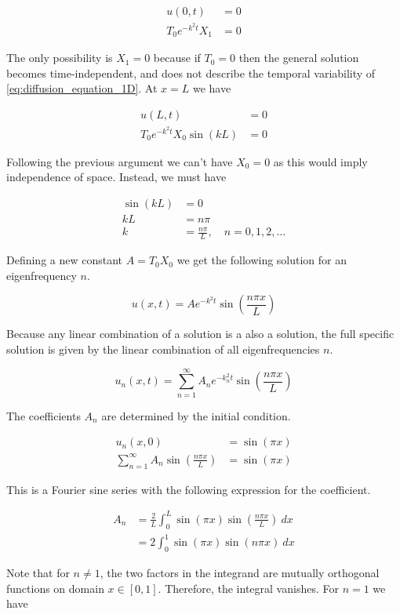 \documentclass[12pt]{extarticle}
\begin{document}
\begin{align*}
	u(0,t) &= 0 \\
	T_0 e^{-k^2 t} X_1 &= 0 
\end{align*}

The only possibility is $X_1 = 0$ because if $T_0=0$ then the general solution becomes time-independent, and does not describe the temporal variability of  \eqref{eq:diffusion_equation_1D}. At $x=L$ we have

\begin{align*}
	u(L,t) &= 0 \\
	T_0 e^{-k^2 t} X_0 \sin(kL) &= 0
\end{align*}

Following the previous argument we can't have $X_0=0$ as this would imply independence of space. Instead, we must have 

\begin{align*}
	\sin(kL) &= 0 \\
	kL &= n\pi \\
	k &= \frac{n\pi}{L}, \quad n=0,1,2,\dots
\end{align*}

Defining a new constant $A=T_0 X_0$ we get the following solution for an eigenfrequency $n$.

\[ u(x,t) = A e^{-k^2t} \sin(\frac{n\pi x}{L}) \]

Because any linear combination of a solution is a also a solution, the full specific solution is given by the linear combination of all eigenfrequencies $n$.

\[ u_n(x,t) = \sum_{n=1}^{\infty} A_n e^{-k_n^2 t} \sin(\frac{n\pi x}{L}) \]

The coefficients $A_n$ are determined by the initial condition.

\begin{align*}
	u_n(x,0) &= \sin(\pi x) \\
	\sum_{n=1}^{\infty} A_n \sin(\frac{n\pi x}{L}) &= \sin(\pi x) 
\end{align*}

This is a Fourier sine series with the following expression for the coefficient.

\begin{align*}
	A_n &= \frac{2}{L} \int_0^L \sin(\pi x)\sin(\frac{n\pi x}{L})\:dx \\
	&= 2 \int_0^1 \sin(\pi x)\sin(n\pi x)\:dx
\end{align*}

Note that for $n \ne 1$, the two factors in the integrand are mutually orthogonal functions on domain $x \in [0,1]$. Therefore, the integral vanishes. For $n=1$ we have
\end{document}

